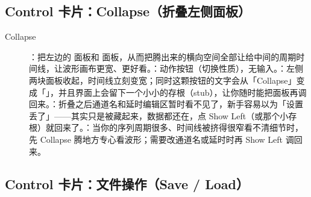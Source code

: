 \documentclass[11pt,oneside,openany]{book}
\begin{document}
\subsection{Control 卡片：Collapse（折叠左侧面板）}

\begin{description}
\item[Collapse] ：把左边的  面板和  面板，从而把腾出来的横向空间全部让给中间的周期时间线，让波形画布更宽、更好看。：动作按钮（切换性质），无输入。：左侧两块面板收起，时间线立刻变宽；同时这颗按钮的文字会从「Collapse」变成「」，并且界面上会留下一个小小的存根（stub），让你随时能把面板再调回来。：折叠之后通道名和延时编辑区暂时看不见了，新手容易以为「设置丢了」——其实只是被藏起来，数据都还在，点 Show Left（或那个小存根）就回来了。：当你的序列周期很多、时间线被挤得很窄看不清细节时，先 Collapse 腾地方专心看波形；需要改通道名或延时时再 Show Left 调回来。
\end{description}

\subsection{Control 卡片：文件操作（Save / Load）}
\end{document}
